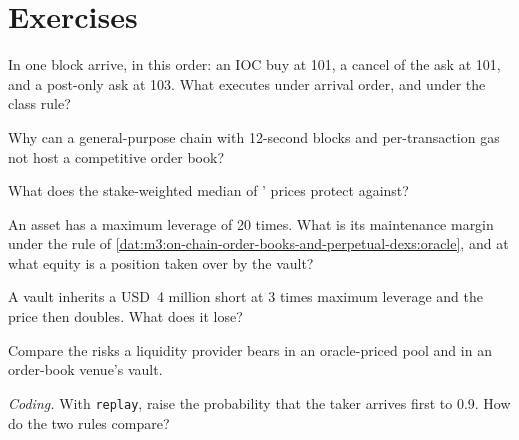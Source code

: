 \section{Exercises}

\begin{exercise}[$\star$]\label{exo:m3:on-chain-order-books-and-perpetual-dexs:1}
In one block arrive, in this order: an IOC buy at 101, a cancel of the ask at 101, and a post-only ask at 103. What executes under arrival order, and under the
class rule?
\end{exercise}

\begin{exercise}[$\star$]\label{exo:m3:on-chain-order-books-and-perpetual-dexs:2}
Why can a general-purpose chain with 12-second blocks and per-transaction gas not host a competitive order book?
\end{exercise}

\begin{exercise}[$\star$]\label{exo:m3:on-chain-order-books-and-perpetual-dexs:3}
What does the stake-weighted median of '  prices protect against?
\end{exercise}

\begin{exercise}[$\star\star$]\label{exo:m3:on-chain-order-books-and-perpetual-dexs:4}
An asset has a maximum leverage of 20 times. What is its maintenance margin under the rule of \cref{dat:m3:on-chain-order-books-and-perpetual-dexs:oracle}, and at
what equity is a position taken over by the vault?
\end{exercise}

\begin{exercise}[$\star\star$]\label{exo:m3:on-chain-order-books-and-perpetual-dexs:5}
A vault inherits a USD~4 million short at 3 times maximum leverage and the price then doubles. What does it lose?
\end{exercise}

\begin{exercise}[$\star\star$]\label{exo:m3:on-chain-order-books-and-perpetual-dexs:6}
Compare the risks a liquidity provider bears in an oracle-priced pool and in an order-book venue's vault.
\end{exercise}

\begin{exercise}[$\star\star\star$]\label{exo:m3:on-chain-order-books-and-perpetual-dexs:7}
\emph{Coding.} With \texttt{replay}, raise the probability that the taker arrives first to 0.9. How do the two rules compare?
\end{exercise}

